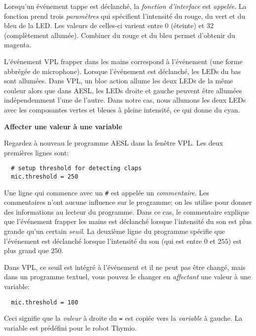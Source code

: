 Lorsqu'un événement tappe est déclanché, la \emph{fonction d'interface}  est \emph{appelée}.
La fonction prend trois \emph{paramètres} qui spécifient l'intensité du rouge, du vert et du bleu de la LED.
Les valeurs de celles-ci varient entre 0 (éteinte) et 32 (complètement allumée).
Combiner du rouge et du bleu permet d'obtenir du magenta.

L'événement VPL frapper dans les mains correspond à l'événement  (une forme abbrégée de 
microphone).
Lorsque l'événement est déclanché, les LEDs du bas sont allumées.
Dans VPL, un bloc action allume les deux LEDs de la même couleur
alors que dans AESL, les LEDs droite et gauche peuvent être allumées indépendemment l'une de l'autre.
Dans notre cas, nous allumons les deux LEDs avec les composantes vertes et bleues à pleine intensité,
ce qui donne du cyan.

\textbf{\large Affecter une valeur à une variable}

Regardez à nouveau le programme AESL dans la fenêtre VPL.
Les deux premières lignes sont:

\begin{footnotesize}
\begin{verbatim}
  # setup threshold for detecting claps
  mic.threshold = 250
\end{verbatim}
\end{footnotesize}

Une ligne qui commence avec un \verb+#+ est appelée un \emph{commentaire}.
Les commentaires n'ont aucune influence sur le programme;
on les utilise pour donner des informations au lecteur du programme.
Dans ce cas, le commentaire explique que l'événement frapper les mains 
est déclanché lorsque l'intensité du son est plus grande qu'un certain
\emph{seuil}.
La deuxième ligne du programme spécifie que l'événement est déclanché lorsque l'intensité du son
(qui est entre $0$ et $255$) est plus grand que $250$.

Dans VPL, ce seuil est intégré à l'événement et il ne peut pas être changé,
mais dans un programme textuel, vous pouvez le changer en \emph{affectant} une valeur à une variable:

\begin{footnotesize}
\begin{verbatim}
  mic.threshold = 180
\end{verbatim}
\end{footnotesize}

Ceci signifie que la \emph{valeur} à droite du \verb+=+ est copiée vers la \emph{variable}
à gauche.
La variable  est prédéfini pour le robot Thymio.

